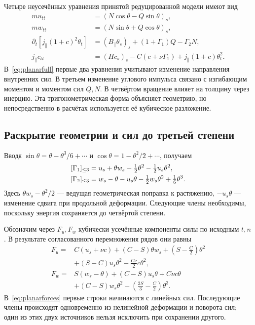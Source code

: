 \documentclass[11pt,a4paper]{article}
\begin{document}
Четыре неусечённых уравнения принятой редуцированной модели имеют вид
\begin{equation}
\begin{aligned}
mu_{tt}&=(N\cos\theta-Q\sin\theta)_s,\\
mw_{tt}&=(N\sin\theta+Q\cos\theta)_s,\\
\partial_t[j_\parallel(1+c)^2\theta_t]
&=(B_\parallel\theta_s)_s+(1+\Gamma_1)Q-\Gamma_2N,\\
j_\parallel c_{tt}&=(Hc_s)_s-C(c+\nu\Gamma_1)
+j_\parallel(1+c)\theta_t^2.
\end{aligned}
\label{eq:planarfull}
\end{equation}
В~\eqref{eq:planarfull} первые два уравнения учитывают изменение направления внутренних сил. В третьем изменение углового импульса связано с изгибающим моментом и моментом сил $Q,N$. В четвёртом вращение влияет на толщину через инерцию. Эта тригонометрическая форма объясняет геометрию, но непосредственно в расчётах используется её кубическое разложение.

\subsection{Раскрытие геометрии и сил до третьей степени}
Вводя $\sin\theta=\theta-\theta^3/6+\cdots$ и $\cos\theta=1-\theta^2/2+\cdots$, получаем
\[
\begin{aligned}
\relax[\Gamma_1]_{\leq3}&=u_s+\theta w_s-\tfrac12\theta^2-\tfrac12u_s\theta^2,\\
[\Gamma_2]_{\leq3}&=w_s-\theta-u_s\theta-\tfrac12w_s\theta^2+\tfrac16\theta^3.
\end{aligned}
\]
Здесь $\theta w_s-\theta^2/2$ --- ведущая геометрическая поправка к растяжению, $-u_s\theta$ --- изменение сдвига при продольной деформации. Следующие члены необходимы, поскольку энергия сохраняется до четвёртой степени.

Обозначим через $F_u,F_w$ кубически усечённые компоненты силы по исходным $t,n$. В результате согласованного перемножения рядов они равны
\begin{equation}
\begin{aligned}
F_u={}&C(u_s+\nu c)
+(C-S)\theta w_s+(S-\tfrac C2)\theta^2\\
&+(S-C)u_s\theta^2-\tfrac{C\nu}{2}c\theta^2,\\
F_w={}&S(w_s-\theta)+(C-S)u_s\theta+C\nu c\theta\\
&+(C-S)w_s\theta^2+(\tfrac{2S}{3}-\tfrac C2)\theta^3.
\end{aligned}
\label{eq:planarforces}
\end{equation}
В~\eqref{eq:planarforces} первые строки начинаются с линейных сил. Последующие члены происходят одновременно из нелинейной деформации и поворота сил; один из этих двух источников нельзя исключить при сохранении другого.
\end{document}
